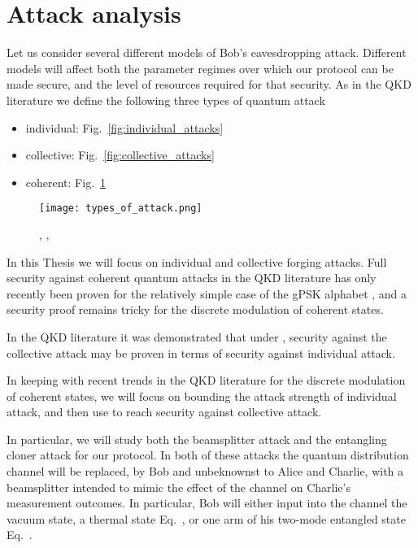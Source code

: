 \section{Attack analysis}\label{sec:attack_analysis}
Let us consider several different models of Bob's eavesdropping attack. Different models will affect both the parameter regimes over which our protocol can be made secure, and the level of resources required for that security. As in the QKD literature we define the following three types of quantum attack
\begin{itemize}
\item individual: Fig.~\ref{fig:individual_attacks}
\item collective: Fig.~\ref{fig:collective_attacks}
\item coherent: Fig.~\ref{fig:coherent_attacks}
\end{itemize}

\begin{figure}[htp]
\centering
\texttt{[image: types\_of\_attack.png]}
\caption{\label{fig:individual_attacks}, \label{fig:collective_attacks},\label{fig:coherent_attacks}}
\end{figure}

In this Thesis we will focus on individual and collective forging attacks. Full security against coherent quantum attacks in the QKD literature has only recently been proven for the relatively simple case of the gPSK alphabet , and a security proof remains tricky for the discrete modulation of coherent states. %

In the QKD literature it was demonstrated  that under , security against the collective attack may be proven in terms of security against individual attack. 

In keeping with recent trends in the QKD literature for the discrete modulation of coherent states, we will focus on bounding the attack strength of individual attack, and then use  to reach security against collective attack. 


In particular, we will study both the beamsplitter attack and the entangling cloner attack for our protocol. In both of these attacks the quantum distribution channel will be replaced, by Bob and unbeknownst to Alice and Charlie, with a beamsplitter intended to mimic the effect of the channel on Charlie's measurement outcomes. In particular, Bob will either input into the channel the vacuum state, a thermal state Eq.~, or one arm of his two-mode entangled state Eq.~.

